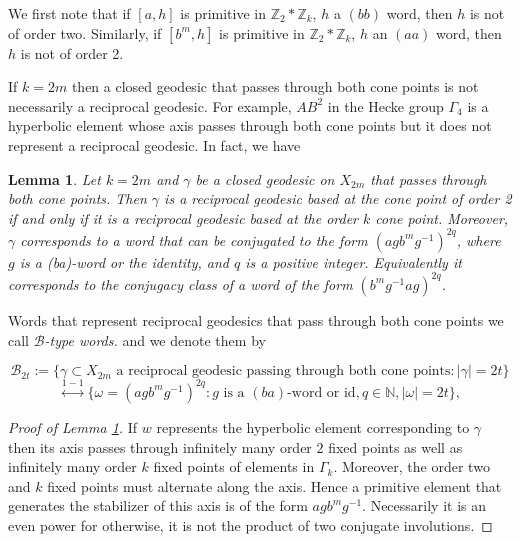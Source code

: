 \documentclass[11pt]{amsart}
\numberwithin{equation}{section}
\theoremstyle{plain}
\newtheorem{lem}[thm]{Lemma}
\begin{document}
We first note that if $[a,h]$  is primitive in 
$\mathbb{Z}_2\ast\mathbb{Z}_k$, $h$ a $(bb)$ word, then $h$ is not of order two. 
Similarly, if $[b^{m}, h]$ is primitive in 
$\mathbb{Z}_2\ast\mathbb{Z}_k$, $h$ an $(aa)$ word,  then $h$ is not of order 2.
 
 If  $k=2m$  then a  closed geodesic that passes through both cone points is not necessarily a reciprocal geodesic. For example, 
 $AB^{2}$  in the Hecke group $\Gamma_{4}$ is a hyperbolic element whose axis   passes through both cone points but it does not represent a reciprocal geodesic. 
  In fact, we have
 
 
 
 \begin{lem}\label{lem: passing through both cone points}
 Let $k=2m$ and  $\gamma$  be a closed geodesic on $X_{2m}$ that passes through both cone points. 
 Then $\gamma$ is a reciprocal geodesic based at the cone point of order 2  if and only if it is a reciprocal geodesic based at the order $k$ cone point. 
 Moreover, $\gamma$  corresponds to a word that can be conjugated to  the form $(agb^{m}g^{-1})^{2q}$, where  $g$ is a (ba)-word  or the identity, and $q$ is a positive integer. Equivalently it corresponds to the conjugacy class of a word of the  form $(b^{m}g^{-1}ag)^{2q}$.
 \end{lem}
 
 Words that represent reciprocal geodesics that pass through both cone points we call {\it $\mathcal{B}$-type words.} and we denote them by
 
 \[\mathcal{B}_{2t}:=\{\gamma \subset X_{2m} \text{ a reciprocal geodesic  passing through both cone points}: |\gamma|=2t\}\] 
\[\overset{1-1}{\longleftrightarrow}\{\omega=(agb^mg^{-1})^{2q}:\textrm{$g$ is a $(ba)$-word or id}, q\in\mathbb{N}, |\omega|=2t\},\]   

 \begin{proof}[Proof of Lemma \ref{lem: passing through both cone points}]
 If $w$ represents the hyperbolic element corresponding to 
 $\gamma$ then its axis passes through infinitely many  order $2$ fixed points as well as  infinitely many order $k$ fixed points of elements  in $\Gamma_{k}$.  Moreover, the order two  and $k$ fixed points must alternate along the axis. Hence  a primitive element that generates the stabilizer of this axis is of the form $agb^{m}g^{-1}$. Necessarily it is an even power for otherwise, it is not the product of two conjugate involutions.
 \end{proof}
 
\end{document}
